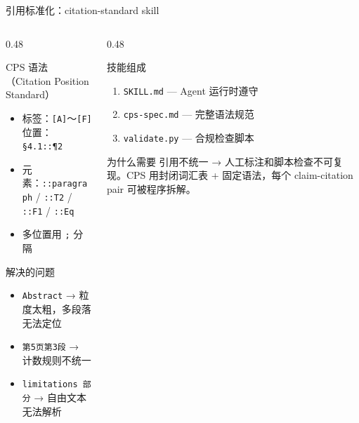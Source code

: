 \documentclass[UTF8,fontset=fandol,aspectratio=169]{ctexbeamer}
\begin{document}
\begin{frame}{引用标准化：citation-standard skill}
  \begin{columns}[T,onlytextwidth]
    \begin{column}{0.48\textwidth}
      \begin{block}{CPS 语法（Citation Position Standard）}
        \begin{itemize}
          \setlength{\itemsep}{3pt}
          \item 标签：\texttt{[A]}～\texttt{[F]} \quad 位置：\texttt{\S4.1::\P2}
          \item 元素：\texttt{::paragraph} / \texttt{::T2} / \texttt{::F1} / \texttt{::Eq}
          \item 多位置用 \texttt{;} 分隔
        \end{itemize}
      \end{block}

      \begin{block}{解决的问题}
        \begin{itemize}
          \setlength{\itemsep}{1pt}
          \item \texttt{Abstract} → 粒度太粗，多段落无法定位
          \item \texttt{第5页第3段} → 计数规则不统一
          \item \texttt{limitations 部分} → 自由文本无法解析
        \end{itemize}
      \end{block}
    \end{column}
    \begin{column}{0.48\textwidth}
      \begin{block}{技能组成}
        \begin{enumerate}
          \setlength{\itemsep}{2pt}
          \item \texttt{SKILL.md} — Agent 运行时遵守
          \item \texttt{cps-spec.md} — 完整语法规范
          \item \texttt{validate.py} — 合规检查脚本
        \end{enumerate}
      \end{block}
      \begin{block}{为什么需要}
        引用不统一 → \alert{人工标注和脚本检查不可复现}。CPS 用封闭词汇表 + 固定语法，每个 claim-citation pair 可被程序拆解。
      \end{block}
    \end{column}
  \end{columns}

\end{frame}
\end{document}
